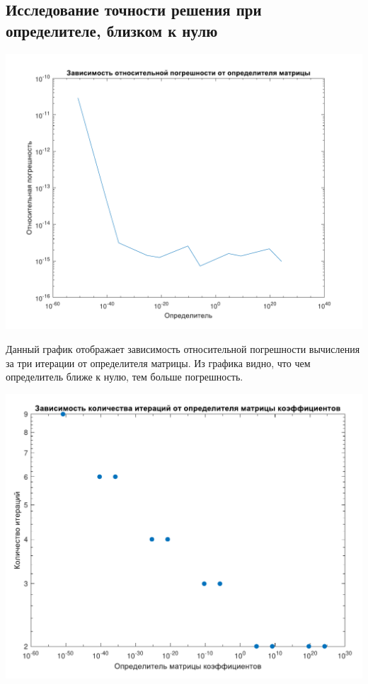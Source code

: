 \subsection{Исследование точности решения при определителе, близком к нулю}

\includegraphics[scale=0.5]{5.pdf}

Данный график отображает зависимость относительной погрешности вычисления за три итерации от определителя матрицы. Из графика видно, что чем определитель ближе к нулю, тем больше погрешность.

\includegraphics[scale=0.5]{2.pdf}

